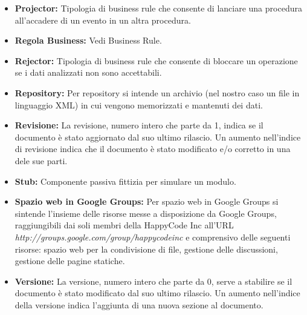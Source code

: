 \documentclass[11pt,titlepage,a4paper]{report}
\begin{document}
\begin{itemize}
\item{\textbf{Projector:}
Tipologia di business rule che consente di lanciare una procedura all'accadere di un evento in un altra procedura.}

\item{\textbf{Regola Business:}
Vedi Business Rule.}

\item{\textbf{Rejector:}
Tipologia di business rule che consente di bloccare un operazione se i dati analizzati non sono accettabili.}
 
\item{\textbf{Repository:}
Per repository si intende un archivio (nel nostro caso un file in linguaggio XML) in cui vengono memorizzati e mantenuti dei dati.}

\item{\textbf{Revisione:}
La revisione, numero intero che parte da 1,  indica se il documento \`e stato aggiornato dal suo ultimo rilascio. Un aumento nell'indice di revisione indica che il documento \`e stato modificato e/o corretto in una dele sue parti}.

\item{\textbf{Stub:}
Componente passiva fittizia per simulare un modulo.}

\item{\textbf{Spazio web in Google Groups:}
Per spazio web in Google Groups si sintende l'insieme delle risorse messe a disposizione da Google Groups, raggiungibili dai soli membri della HappyCode Inc all'URL\\ \textit{http://groups.google.com/group/happycodeinc} e comprensivo delle seguenti risorse: spazio web per la condivisione di file, gestione delle discussioni, gestione delle pagine statiche.}

\item{\textbf{Versione:}
La versione, numero intero che parte da 0, serve a stabilire se il documento \`e stato modificato dal suo ultimo rilascio. Un aumento nell'indice della versione indica l'aggiunta di  una nuova sezione al documento.}

\end{itemize}
\end{document}
